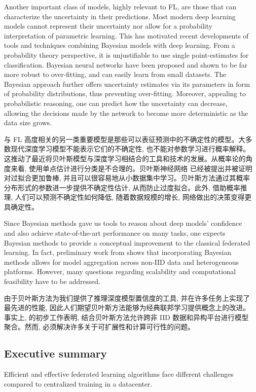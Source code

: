 Another important class of models, highly relevant to FL, are those that can characterize the uncertainty in their predictions. Most modern deep learning models cannot represent their uncertainty nor allow for a probability interpretation of parametric learning. This has motivated recent developments of tools and techniques combining Bayesian models with deep learning. From a probability theory perspective, it is unjustifiable to use single point-estimates for classification. Bayesian neural networks \citep{BL-overview} have been proposed and shown to be far more robust to over-fitting, and can easily learn from small datasets. The Bayesian approach further offers uncertainty estimates via its parameters in form of probability distributions, thus preventing over-fitting. Moreover, appealing to probabilistic reasoning, one can predict how the uncertainty can decrease, allowing the decisions made by the network to become more deterministic as the data size grows. 

与 FL 高度相关的另一类重要模型是那些可以表征预测中的不确定性的模型。大多数现代深度学习模型不能表示它们的不确定性, 也不能对参数学习进行概率解释。这推动了最近将贝叶斯模型与深度学习相结合的工具和技术的发展。从概率论的角度来看, 使用单点估计进行分类是不合理的。贝叶斯神经网络 \citep{BL-overview} 已经被提出并被证明对过拟合更加鲁棒, 并且可以很容易地从小数据集中学习。贝叶斯方法通过其概率分布形式的参数进一步提供不确定性估计, 从而防止过度拟合。此外, 借助概率推理, 人们可以预测不确定性如何降低, 随着数据规模的增长, 网络做出的决策变得更具确定性。

Since Bayesian methods gave us tools to reason about deep models’ confidence and also achieve state-of-the-art performance on many tasks, one expects Bayesian methods to provide a conceptual improvement to the classical federated learning. In fact, preliminary work from \citet{BayesFL} shows that incorporating Bayesian methods allows for model aggregation across non-IID data and heterogeneous platforms. However, many questions regarding scalability and computational feasibility have to be addressed.


由于贝叶斯方法为我们提供了推理深度模型置信度的工具, 并在许多任务上实现了最先进的性能, 因此人们期望贝叶斯方法能够为经典联邦学习提供概念上的改进。事实上, \citet{BayesFL} 的初步工作表明, 结合贝叶斯方法允许跨非 IID 数据和异构平台进行模型聚合。然而, 必须解决许多关于可扩展性和计算可行性的问题。


\subsection{Executive summary}
Efficient and effective federated learning algorithms face different challenges compared to centralized training in a datacenter. 

